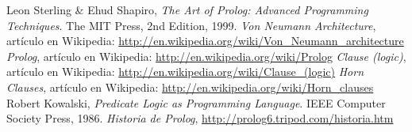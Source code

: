 \documentclass[12pt,titlepage]{article}
\begin{document}
\clearpage
\begin{thebibliography}{9}
     Leon Sterling \& Ehud Shapiro, \emph{The Art of Prolog: Advanced Programming Techniques}. The MIT Press, 2nd Edition, 1999.
     \emph{Von Neumann Architecture}, artículo en Wikipedia: \url{http://en.wikipedia.org/wiki/Von\_Neumann\_architecture}
     \emph{Prolog}, artículo en Wikipedia: \url{http://en.wikipedia.org/wiki/Prolog}
     \emph{Clause (logic)}, artículo en Wikipedia: \url{http://en.wikipedia.org/wiki/Clause_(logic)}
     \emph{Horn Clauses}, artículo en Wikipedia: \url{http://en.wikipedia.org/wiki/Horn_clauses}
     Robert Kowalski, \emph{Predicate Logic as Programming Language}. IEEE Computer Society Press, 1986.
     \emph{Historia de Prolog}, \url{http://prolog6.tripod.com/historia.htm}
\end{thebibliography}

\end{document}
